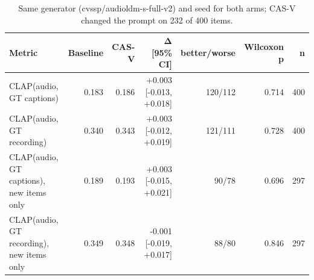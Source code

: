 \begin{table}[t]
\centering
\caption{Same generator (cvssp/audioldm-s-full-v2) and seed for both arms; CAS-V changed the prompt on 232 of 400 items.}
\label{tab:table3_generated_audio}
\begin{tabular}{lrrrrrr}
\toprule
Metric & Baseline & CAS-V & Δ [95\% CI] & better/worse & Wilcoxon p & n \\
\midrule
CLAP(audio, GT captions) & 0.183 & 0.186 & +0.003 [-0.013, +0.018] & 120/112 & 0.714 & 400 \\
CLAP(audio, GT recording) & 0.340 & 0.343 & +0.003 [-0.012, +0.019] & 121/111 & 0.728 & 400 \\
CLAP(audio, GT captions), new items only & 0.189 & 0.193 & +0.003 [-0.015, +0.021] & 90/78 & 0.696 & 297 \\
CLAP(audio, GT recording), new items only & 0.349 & 0.348 & -0.001 [-0.019, +0.017] & 88/80 & 0.846 & 297 \\
\bottomrule
\end{tabular}
\end{table}
